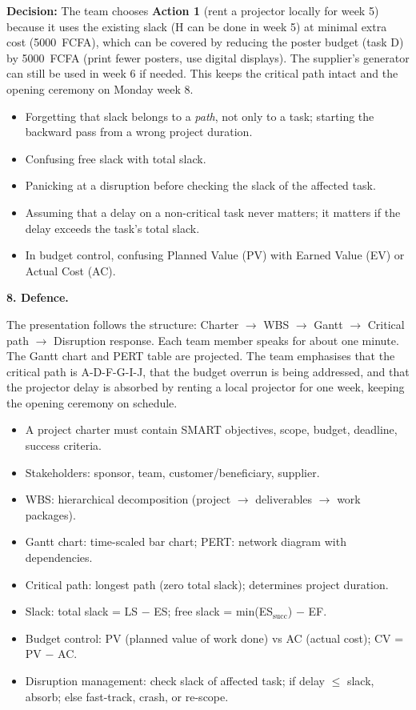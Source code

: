\documentclass[11pt]{article}
\begin{document}
\textbf{Decision:} The team chooses \textbf{Action 1} (rent a projector locally for week 5) because it uses the existing slack (H can be done in week 5) at minimal extra cost (\SI{5000}{FCFA}), which can be covered by reducing the poster budget (task D) by \SI{5000}{FCFA} (print fewer posters, use digital displays). The supplier's generator can still be used in week 6 if needed. This keeps the critical path intact and the opening ceremony on Monday week 8.

\begin{attention}
\begin{itemize}
\item Forgetting that slack belongs to a \emph{path}, not only to a task; starting the backward pass from a wrong project duration.
\item Confusing free slack with total slack.
\item Panicking at a disruption before checking the slack of the affected task.
\item Assuming that a delay on a non-critical task never matters; it matters if the delay exceeds the task's total slack.
\item In budget control, confusing Planned Value (PV) with Earned Value (EV) or Actual Cost (AC).
\end{itemize}
\end{attention}

\textbf{8. Defence.}

The presentation follows the structure: Charter $\rightarrow$ WBS $\rightarrow$ Gantt $\rightarrow$ Critical path $\rightarrow$ Disruption response. Each team member speaks for about one minute. The Gantt chart and PERT table are projected. The team emphasises that the critical path is A-D-F-G-I-J, that the budget overrun is being addressed, and that the projector delay is absorbed by renting a local projector for one week, keeping the opening ceremony on schedule.

\begin{aretenir}
\begin{itemize}
\item A project charter must contain SMART objectives, scope, budget, deadline, success criteria.
\item Stakeholders: sponsor, team, customer/beneficiary, supplier.
\item WBS: hierarchical decomposition (project $\rightarrow$ deliverables $\rightarrow$ work packages).
\item Gantt chart: time-scaled bar chart; PERT: network diagram with dependencies.
\item Critical path: longest path (zero total slack); determines project duration.
\item Slack: total slack = LS $-$ ES; free slack = min(ES$_{\text{succ}}$) $-$ EF.
\item Budget control: PV (planned value of work done) vs AC (actual cost); CV = PV $-$ AC.
\item Disruption management: check slack of affected task; if delay $\le$ slack, absorb; else fast-track, crash, or re-scope.
\end{itemize}
\end{aretenir}
\end{document}
